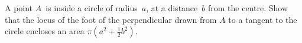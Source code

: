 A point $A$~is inside a circle of radius~$a$, at a distance~$b$ from the
centre. Show that the locus of the foot of the perpendicular drawn from
$A$ to a tangent to the circle encloses an area $\pi(a^{2} + \frac{1}{2}b^{2})$.

